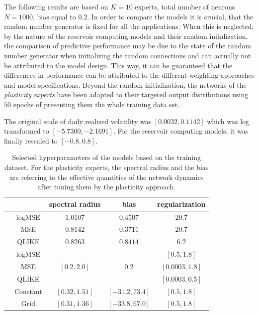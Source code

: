 The following results are based on $K=10$ experts, total number of neurons $N=1000$, bias equal to $0.2$. In order to compare the models it is crucial, that the random number generator is fixed for all the applications. When this is neglected, by the nature of the reservoir computing models and their random initalization, the comparison of predictive performance may be due to the state of the random number generator when initializing the random connections and can actually not be attributed to the model design. This way, it can be guaranteed that the differences in performance can be attributed to the different weighting approaches and model specifications.
Beyond the random initialization, the networks of the \textit{plasticity experts} have been adapted to their targeted output distributions using $50$ epochs of presenting them the whole training data set.

The original scale of daily realized volatility was $[0.0032, 0.1142]$ which was log transformed to $[-5.7300, -2.1691]$. For the reservoir computing models, it was finally rescaled to $[-0.8, 0.8]$.


\begin{table}
    \begin{center}
        \begin{tabular}{|c|c|c|c|c|}
            \hline
            \multicolumn{2}{|c|}{}    & spectral radius & bias & regularization \\\hline
            \parbox[t]{2mm}{} & logMSE & $1.0107$ & $0.4507$ & $20.7$ \\
            & MSE & $0.8142$ & $0.3711$ & $20.7$ \\
            & QLIKE & $0.8263$ & $0.8414$ & $6.2$ \\\hline
            \parbox[t]{2mm}{} & logMSE  &  &  & $[0.5, 1.8]$  \\
            & MSE & & & $[0.0003, 1.8]$ \\
            & QLIKE & & & $[0.0003, 0.5]$ \\\hline
            \parbox[t]{2mm}{} & Constant & $[0.32, 1.51]$ & $[-31.2, 73.4]$ & $[0.5, 1.8]$ \\
            & Grid & $[0.31, 1.36]$ & $[-33.8, 67.0]$ & $[0.5, 1.8]$ \\
            \hline
        \end{tabular}
        \label{TABLE:SelectedHyperparameters}
    \end{center}
    \caption{Selected hyperparameters of the models based on the training dataset. For the plasticity experts, the spectral radius and the bias are referring to the effective quantities of the network dynamics after tuning them by the plasticity approach.}
\end{table}


